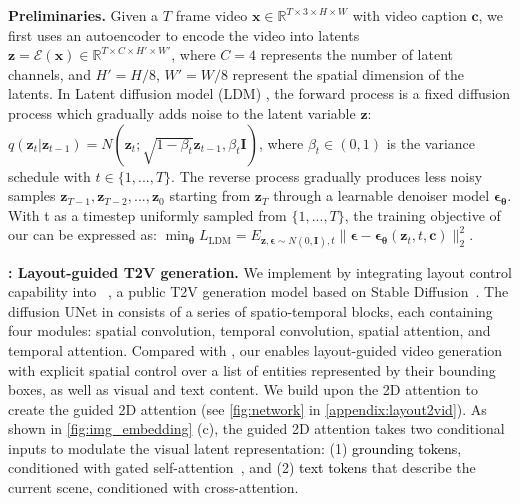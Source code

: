 \documentclass{article}
\begin{document}
\vspace{5pt}
\noindent\textbf{Preliminaries.}
Given a $T$ frame video $\bm{x}\in\mathbb{R}^{T\times 3 \times H \times W}$ with video caption $\bm{c}$, we first uses an autoencoder to encode the video into latents $\bm{z}=\mathcal{E}(\bm{x})\in\mathbb{R}^{T\times C \times H' \times W'}$, where $C=4$ represents the number of latent channels, and $H'=H/8$, $W'=W/8$ represent the spatial dimension of the latents. 
In Latent diffusion model (LDM) \citep{rombach2022high}, the forward process is a fixed diffusion process which gradually adds noise to the latent variable $\bm{z}$:
$q(\bm{z}_t|\bm{z}_{t-1})=N(\bm{z}_t; \sqrt{1-\beta_t}\bm{z}_{t-1}, \beta_t \bm{I})$,
where $\beta_t\in(0,1)$ is the variance schedule with $t\in\{1, ..., T\}$.
The reverse process gradually produces less noisy samples $\bm{z}_{T-1}, \bm{z}_{T-2}, ..., \bm{z}_0$ starting from $\bm{z}_{T}$ through a learnable denoiser model $\bm{\epsilon_\theta}$. With t as a timestep uniformly sampled from $\{1, ..., T\}$, the training objective of our \videomodule{} can be expressed as: 
$\min_{\bm{\theta}} L_{\text{LDM}}=E_{\bm{z}, \bm{\epsilon}\sim N(0, \bm{I}), t}\|\bm{\epsilon} - \bm{\epsilon_{\theta}}(\bm{z}_t, t, \bm{c})\|_2^2$.







\vspace{5pt}
\noindent\textbf{\videomodule{}: Layout-guided T2V generation.}
\label{sec:network_structure}
We implement \videomodule{} by integrating layout control capability into \modelscope{}~\citep{wang2023modelscope}, a public T2V generation model based on Stable Diffusion~\citep{rombach2022high}.
The diffusion UNet in \modelscope{} consists of a series of spatio-temporal blocks, each containing four modules: spatial convolution, temporal convolution, spatial attention, and temporal attention.
Compared with \modelscope{}, our \videomodule{}
enables layout-guided video generation 
with explicit spatial control over a list of entities represented by their bounding boxes, as well as visual and text content. 
We build upon the 2D attention 
to create the guided 2D attention (see \cref{fig:network} in \cref{appendix:layout2vid}).
As shown in \cref{fig:img_embedding} (c), the guided 2D attention takes two conditional inputs to modulate the visual latent representation:
(1) \textcolor{black}{grounding tokens}, conditioned with gated self-attention~\citep{li2023gligen},
and
(2) \textcolor{black}{text tokens} that describe the current scene, conditioned with cross-attention.
\end{document}
